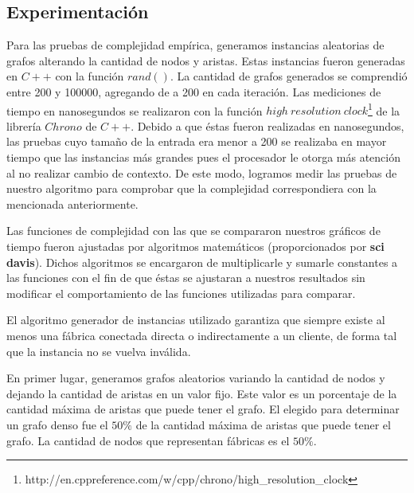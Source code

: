 \subsection{Experimentación}
Para las pruebas de complejidad empírica, generamos instancias aleatorias de grafos alterando la cantidad de nodos y aristas. Estas instancias fueron generadas en $C++$ con la función $rand()$. La cantidad de grafos generados se comprendió entre 200 y 100000, agregando de a 200 en cada iteración. Las mediciones de tiempo en nanosegundos se realizaron con la función $high\ resolution\ clock$\footnote{http://en.cppreference.com/w/cpp/chrono/high\_resolution\_clock} de la librería $Chrono$ de $C++$. Debido a que éstas fueron realizadas en nanosegundos, las pruebas cuyo tamaño de la entrada era menor a 200 se realizaba en mayor tiempo que las instancias más grandes pues el procesador le otorga más atención al no realizar cambio de contexto. De este modo, logramos medir las pruebas de nuestro algoritmo para comprobar que la complejidad correspondiera con la mencionada anteriormente.

Las funciones de complejidad con las que se compararon nuestros gráficos de tiempo fueron ajustadas por algoritmos matemáticos (proporcionados por \textbf{sci davis}). Dichos algoritmos se encargaron de multiplicarle y sumarle constantes a las funciones con el fin de que éstas se ajustaran a nuestros resultados sin modificar el comportamiento de las funciones utilizadas para comparar.

El algoritmo generador de instancias utilizado garantiza que siempre existe al menos una fábrica conectada directa o indirectamente a un cliente, de forma tal que la instancia no se vuelva inválida.

En primer lugar, generamos grafos aleatorios variando la cantidad de nodos y dejando la cantidad de aristas en un valor fijo. Este valor es un porcentaje de la cantidad máxima de aristas que puede tener el grafo. El elegido para determinar un grafo denso fue el $50\%$ de la cantidad máxima de aristas que puede tener el grafo. La cantidad de nodos que representan fábricas es el $50\%$.

